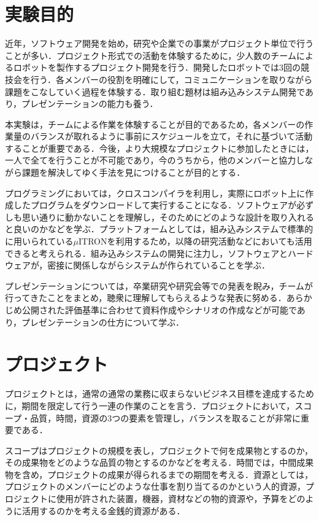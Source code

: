 \begin{multicols*}{2}
\section{実験目的}
近年，ソフトウェア開発を始め，研究や企業での事業がプロジェクト単位で行うことが多い．プロジェクト形式での活動を体験するために，少人数のチームによるロボットを製作するプロジェクト開発を行う．開発したロボットでは3回の競技会を行う．各メンバーの役割を明確にして，コミュニケーションを取りながら課題をこなしていく過程を体験する．取り組む題材は組み込みシステム開発であり，プレゼンテーションの能力も養う．

本実験は，チームによる作業を体験することが目的であるため，各メンバーの作業量のバランスが取れるように事前にスケジュールを立て，それに基づいて活動することが重要である．今後，より大規模なプロジェクトに参加したときには，一人で全てを行うことが不可能であり，今のうちから，他のメンバーと協力しながら課題を解決してゆく手法を見につけることが目的とする．

プログラミングにおいては，クロスコンパイラを利用し，実際にロボット上に作成したプログラムをダウンロードして実行することになる．ソフトウェアが必ずしも思い通りに動かないことを理解し，そのためにどのような設計を取り入れると良いのかなどを学ぶ．プラットフォームとしては，組み込みシステムで標準的に用いられている$\mu$ITRONを利用するため，以降の研究活動などにおいても活用できると考えられる．組み込みシステムの開発に注力し，ソフトウェアとハードウェアが，密接に関係しながらシステムが作られていることを学ぶ．

プレゼンテーションについては，卒業研究や研究会等での発表を睨み，チームが行ってきたことをまとめ，聴衆に理解してもらえるような発表に努める．あらかじめ公開された評価基準に合わせて資料作成やシナリオの作成などが可能であり，プレゼンテーションの仕方について学ぶ．

\section{プロジェクト}%
 プロジェクトとは，通常の通常の業務に収まらないビジネス目標を達成するために，期間を限定して行う一連の作業のことを言う．プロジェクトにおいて，スコープ・品質，時間，資源の3つの要素を管理し，バランスを取ることが非常に重要である．
 
 スコープはプロジェクトの規模を表し，プロジェクトで何を成果物とするのか，その成果物をどのような品質の物とするのかなどを考える．時間では，中間成果物を含め，プロジェクトの成果が得られるまでの期間を考える．資源としては，プロジェクトのメンバーにどのような仕事を割り当てるのかという人的資源，プロジェクトに使用が許された装置，機器，資材などの物的資源や，予算をどのように活用するのかを考える金銭的資源がある．
 

\end{multicols*}
